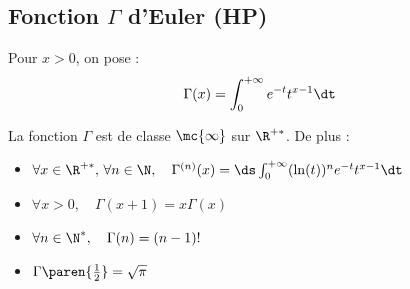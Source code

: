 \subsection{\texorpdfstring{Fonction $\Gamma$ d'Euler (HP)}{Fonction Gamma d'Euler (HP)}}

\begin{definitionnt}{}{}
    Pour $x > 0$, on pose :
    \[ \Gamma(x) = \int_0^{+\infty} e^{-t} t^{x-1} \dt \]
\end{definitionnt}


\begin{theorement}{}{}
    La fonction $\Gamma$ est de classe $\mc{\infty}$ sur $\R^{+*}$. De plus :
    \begin{itemize}
        \item $\forall x \in \R^{+*}, \, \forall n \in \N, \quad \Gamma^{(n)}(x) = \ds\int_0^{+\infty} (\ln(t))^n e^{-t} t^{x-1} \dt$
        \item $\forall x > 0, \quad \Gamma(x+1) = x \Gamma(x)$
        \item $\forall n \in \N^*, \quad \Gamma(n) = (n-1)!$
        \item $\Gamma\paren{\frac{1}{2}} = \sqrt{\pi}$
    \end{itemize}
\end{theorement}

